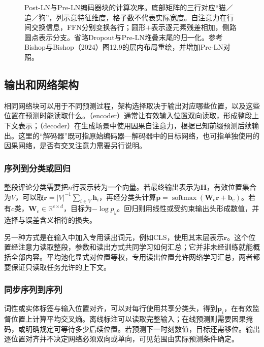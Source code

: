 \begin{figure}[htbp]
  \centering
  
  \caption{Post-LN与Pre-LN编码器块的计算次序。底部矩阵的三行对应“猫／追／狗”，列示意特征维度，格子数不代表实际宽度。自注意力在行间交换信息，FFN分别变换各行；圆形$+$表示逐元素残差相加，侧路圆点表示分支。省略Dropout与Pre-LN堆叠末尾的归一化。参考Bishop与Bishop（2024）图12.9的层内布局重绘，并增加Pre-LN对照。}
  \label{fig:transformer-block}
\end{figure}
\FloatBarrier

\subsection{输出和网络架构}
\label{sec:transformer-architectures}

相同网络块可以用于不同预测过程，架构选择取决于输出对应哪些位置，以及这些位置在预测时能读取什么。（encoder）通常让有效输入位置双向读取，形成整段上下文表示；（decoder）在生成场景中使用因果自注意力，根据已知前缀预测后续输出。这里的“解码器”既可指原始编码器—解码器中的目标网络，也可指单独使用的因果网络，是否有交叉注意力需要另行说明。

\subsubsection{序列到分类或回归}

整段评论分类需要把$n$行表示转为一个向量。若最终输出表示为$\bm H$，有效位置集合为$V$，可以取$\bm r=|V|^{-1}\sum_{i\in V}\bm h_i$，再经分类头计算$\bm p=\operatorname{softmax}(\bm W_{\mathrm c}\bm r+\bm b_{\mathrm c})$。若有$c$类，$\bm W_{\mathrm c}\in\mathbb R^{c\times d}$，目标为$-\log p_y$。回归则用线性或受约束输出头形成数值，并选择与误差含义相符的损失。

另一种方式是在输入中加入专用读出词元，例如CLS，使用其末层表示$\bm r$。这个位置经注意力读取整段，参数和读出方式共同学习如何汇总；它并非未经训练就能概括全部内容。平均池化显式对位置等权，专用读出位置允许网络学习汇总，两者都要保证只读取任务允许的上下文。

\subsubsection{同步序列到序列}

词性或实体标签与输入位置对齐，可以对每行使用共享分类头，得到$\bm p_i$，在有效监督位置上计算平均交叉熵。离线标注可以读取完整输入；在线预测则需要因果掩码，或明确规定可等待多少后续位置。若预测下一时刻数值，目标还需移位。输出逐位置对齐并不决定网络必须双向或单向，可见范围由实际预测条件确定。

